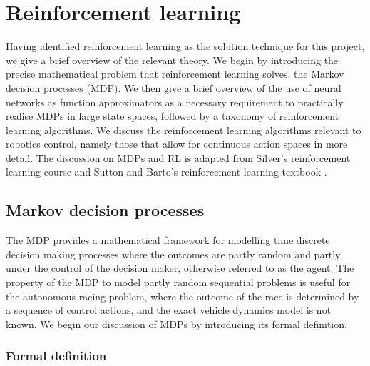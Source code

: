 \chapter{Reinforcement learning}
\label{chp:reinforcement_learning}

Having identified reinforcement learning as the solution technique for this project, we give a brief overview of the relevant theory. 
We begin by introducing the precise mathematical problem that reinforcement learning solves, the Markov decision processes (MDP).
We then give a brief overview of the use of neural networks as function approximators as a necessary requirement to practically realise MDPs in large state spaces, followed by a taxonomy of reinforcement learning algorithms. 
We discuss the reinforcement learning algorithms relevant to robotics control, namely those that allow for continuous action spaces in more detail. The discussion on MDPs and RL is adapted from Silver's reinforcement learning course \cite{silver2015} and Sutton and Barto's reinforcement learning textbook \cite{sutton2020}.

\section{Markov decision processes}

The MDP provides a mathematical framework for modelling time discrete decision making processes where the outcomes are partly random and partly under the control of the decision maker, otherwise referred to as the agent. 
The property of the MDP to model partly random sequential problems is useful for the autonomous racing problem, where the outcome of the race is determined by a sequence of control actions, and the exact vehicle dynamics model is not known.
We begin our discussion of MDPs by introducing its formal definition.

\subsection{Formal definition}
\label{sec:mdp_def}

